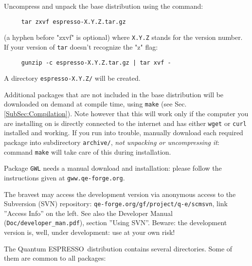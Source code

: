 \documentclass[12pt,a4paper]{article}
\def\qe{{\sc Quantum ESPRESSO}}
\begin{document}
Uncompress and unpack the base distribution using the command:
\begin{verbatim}
     tar zxvf espresso-X.Y.Z.tar.gz
\end{verbatim}
(a hyphen before "zxvf" is optional) where \texttt{X.Y.Z} stands for the
version number. If your version of \texttt{tar} 
doesn't recognize the "z" flag:
\begin{verbatim}
     gunzip -c espresso-X.Y.Z.tar.gz | tar xvf -
\end{verbatim}
A directory \texttt{espresso-X.Y.Z/} will be created. 

Additional packages that are not included in the base distribution
will be downloaded on demand at compile time, using \texttt{make} 
(see Sec.\ref{SubSec:Compilation}).
Note however that this will work only if the computer you are 
installing on is directly connected to the internet and has
either \texttt{wget} or \texttt{curl} installed and working. 
If you run into trouble, manually download each required package 
into subdirectory \texttt{archive/}, {\em not unpacking or
uncompressing it}:
command \texttt{make} will take care of this during installation. 

Package \texttt{GWL} needs a manual download and installation:
please follow the instructions given at \texttt{gww.qe-forge.org}.



The bravest may access the development version via anonymous access to the
Subversion (SVN) repository: \texttt{qe-forge.org/gf/project/q-e/scmsvn}, 
link ''Access Info'' on the left. See also the Developer Manual
(\texttt{Doc/developer\_man.pdf}), section ''Using SVN''.
Beware: the development version 
is, well, under development: use at your own risk! 

The \qe\ distribution contains several directories. Some of them are
common to all packages:
\end{document}
